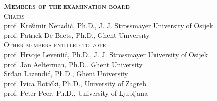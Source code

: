 \documentclass[
  11pt, %
  oneside, %
  english, %
  singlespacing, %
  liststotoc, %
  headsepline, %
  chapterinoneline, %
]{MastersDoctoralThesis} %
\begin{document}
\vfill

{\setlength{\parindent}{0cm}
\textsc{\textbf{Members of the examination board}}\\[0.35em]

\textsc{Chairs}\\[0.35em]

prof. Krešimir Nenadić, Ph.D., J. J. Strossmayer University of Osijek\\
prof. Patrick De Baets, Ph.D., Ghent University\\[0.35em]

\textsc{Other members entitled to vote}\\[0.35em]

prof. Hrvoje Leventić, Ph.D., J. J. Strossmayer University of Osijek\\
prof. Jan Aelterman, Ph.D., Ghent University\\
Srđan Lazendić, Ph.D., Ghent University\\
prof. Ivica Botički, Ph.D., University of Zagreb\\
prof. Peter Peer, Ph.D., University of Ljubljana
}

\clearpage

% 










{\hypersetup{linkcolor=black} %
  \tableofcontents %
}


  
\end{document}
